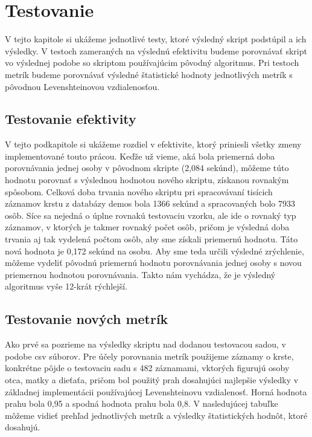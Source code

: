 \chapter{Testovanie}

V tejto kapitole si ukážeme jednotlivé testy, ktoré výsledný skript podstúpil a ich výsledky. V testoch zameraných na výslednú efektivitu budeme porovnávať skript vo výslednej podobe so skriptom používajúcim pôvodný algoritmus. Pri testoch metrík budeme porovnávať výsledné štatistické hodnoty jednotlivých metrík s pôvodnou Levenshteinovou vzdialenosťou.

\section{Testovanie efektivity}

V tejto podkapitole si ukážeme rozdiel v efektivite, ktorý priniesli všetky zmeny implementované touto prácou. Keďže už vieme, aká bola priemerná doba porovnávania jednej osoby v pôvodnom skripte (2,084 sekúnd), môžeme túto hodnotu porovnať s výslednou hodnotou nového skriptu, získanou rovnakým spôsobom. Celková doba trvania nového skriptu pri spracovávaní tisícich záznamov krstu z databázy demos bola 1366 sekúnd a spracovaných bolo 7933 osôb. Síce sa nejedná o úplne rovnakú testovaciu vzorku, ale ide o rovnaký typ záznamov, v ktorých je takmer rovnaký počet osôb, pričom je výsledná doba trvania aj tak vydelená počtom osôb, aby sme získali priemernú hodnotu. Táto nová hodnota je 0,172 sekúnd na osobu. Aby sme teda určili výsledné zrýchlenie, môžeme vydeliť pôvodnú priemernú hodnotu porovnávania jednej osoby s novou priemernou hodnotou porovnávania. Takto nám vychádza, že je výsledný algoritmus vyše 12-krát rýchlejší.

\section{Testovanie nových metrík}

Ako prvé sa pozrieme na výsledky skriptu nad dodanou testovacou sadou, v podobe csv súborov. Pre účely porovnania metrík použijeme záznamy o krste, konkrétne pôjde o testovaciu sadu s 482 záznamami, vktorých figurujú osoby otca, matky a dieťaťa, pričom bol použitý prah dosahujúci najlepšie výsledky v základnej implementácii používajúcej Levenshteinovu vzdialenosť. Horná hodnota prahu bola 0,95 a spodná hodnota prahu bola 0,8. V nasledujúcej tabuľke môžeme vidieť prehľad jednotlivých metrík a výsledky štatistických hodnôt, ktoré dosahujú.
\pagebreak

